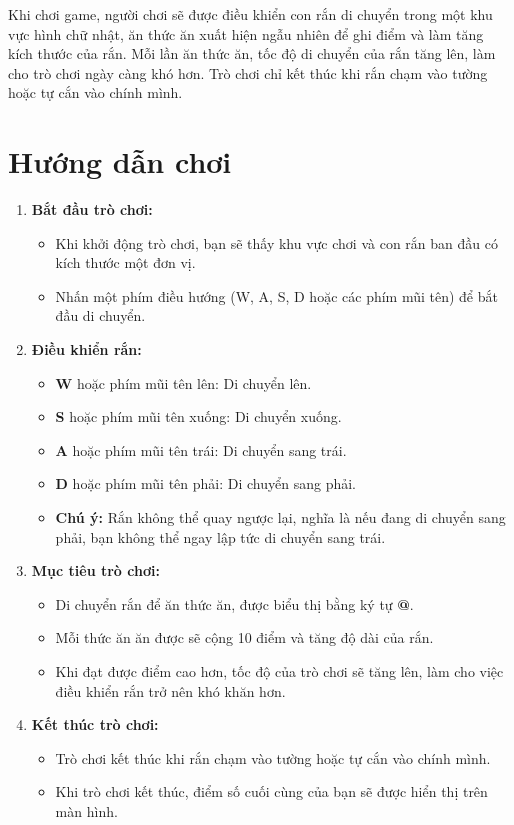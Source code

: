 \documentclass[12pt]{report}
\begin{document}
Khi chơi game, người chơi sẽ được điều khiển con rắn di chuyển trong một khu vực hình chữ nhật, ăn thức ăn xuất hiện ngẫu nhiên để ghi điểm và làm tăng kích thước của rắn. Mỗi lần ăn thức ăn, tốc độ di chuyển của rắn tăng lên, làm cho trò chơi ngày càng khó hơn. Trò chơi chỉ kết thúc khi rắn chạm vào tường hoặc tự cắn vào chính mình.

\section{Hướng dẫn chơi}

\begin{enumerate}[label=\arabic*.]
    \item \textbf{Bắt đầu trò chơi:}
    \begin{itemize}
        \item Khi khởi động trò chơi, bạn sẽ thấy khu vực chơi và con rắn ban đầu có kích thước một đơn vị.
        \item Nhấn một phím điều hướng (W, A, S, D hoặc các phím mũi tên) để bắt đầu di chuyển.
    \end{itemize}
    
    \item \textbf{Điều khiển rắn:}
    \begin{itemize}
        \item \textbf{W} hoặc phím mũi tên lên: Di chuyển lên.
        \item \textbf{S} hoặc phím mũi tên xuống: Di chuyển xuống.
        \item \textbf{A} hoặc phím mũi tên trái: Di chuyển sang trái.
        \item \textbf{D} hoặc phím mũi tên phải: Di chuyển sang phải.
        \item \textbf{Chú ý:} Rắn không thể quay ngược lại, nghĩa là nếu đang di chuyển sang phải, bạn không thể ngay lập tức di chuyển sang trái.
    \end{itemize}
    
    \item \textbf{Mục tiêu trò chơi:}
    \begin{itemize}
        \item Di chuyển rắn để ăn thức ăn, được biểu thị bằng ký tự \textbf{@}.
        \item Mỗi thức ăn ăn được sẽ cộng 10 điểm và tăng độ dài của rắn.
        \item Khi đạt được điểm cao hơn, tốc độ của trò chơi sẽ tăng lên, làm cho việc điều khiển rắn trở nên khó khăn hơn.
    \end{itemize}
        \item \textbf{Kết thúc trò chơi:}
    \begin{itemize}
        \item Trò chơi kết thúc khi rắn chạm vào tường hoặc tự cắn vào chính mình.
        \item Khi trò chơi kết thúc, điểm số cuối cùng của bạn sẽ được hiển thị trên màn hình.
    \end{itemize}
    

\end{enumerate}
\end{document}
